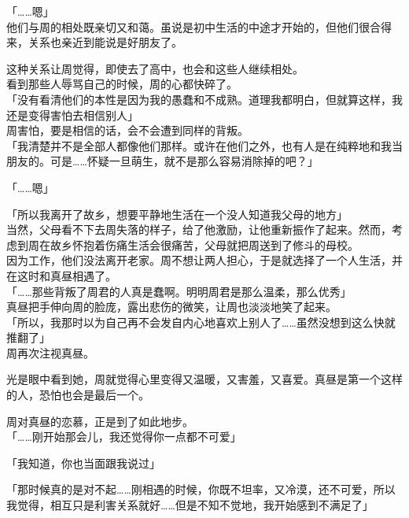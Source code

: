 「……嗯」\\

他们与周的相处既亲切又和蔼。虽说是初中生活的中途才开始的，但他们很合得来，关系也亲近到能说是好朋友了。

这种关系让周觉得，即使去了高中，也会和这些人继续相处。\\

看到那些人辱骂自己的时候，周的心都快碎了。\\

「没有看清他们的本性是因为我的愚蠢和不成熟。道理我都明白，但就算这样，我还是变得害怕去相信别人」\\

周害怕，要是相信的话，会不会遭到同样的背叛。\\

「我清楚并不是全部人都像他们那样。或许在他们之外，也有人是在纯粹地和我当朋友的。可是……怀疑一旦萌生，就不是那么容易消除掉的吧？」

「……嗯」

「所以我离开了故乡，想要平静地生活在一个没人知道我父母的地方」\\

当然，父母看不下去周失落的样子，给了他激励，让他重新振作了起来。然而，考虑到周在故乡怀抱着伤痛生活会很痛苦，父母就把周送到了修斗的母校。\\

因为工作，他们没法离开老家。周不想让两人担心，于是就选择了一个人生活，并在这时和真昼相遇了。\\

「……那些背叛了周君的人真是蠢啊。明明周君是那么温柔，那么优秀」\\

真昼把手伸向周的脸庞，露出悲伤的微笑，让周也淡淡地笑了起来。\\

「所以，我那时以为自己再不会发自内心地喜欢上别人了……虽然没想到这么快就推翻了」\\

周再次注视真昼。

光是眼中看到她，周就觉得心里变得又温暖，又害羞，又喜爱。真昼是第一个这样的人，恐怕也会是最后一个。

周对真昼的恋慕，正是到了如此地步。\\

「……刚开始那会儿，我还觉得你一点都不可爱」

「我知道，你也当面跟我说过」

「那时候真的是对不起……刚相遇的时候，你既不坦率，又冷漠，还不可爱，所以我觉得，相互只是利害关系就好……但是不知不觉地，我开始感到不满足了」\\

